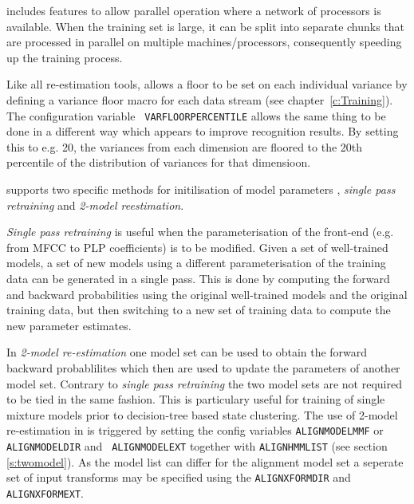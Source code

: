  includes features to allow parallel operation where a network
of processors is available. When the training set is large, it can be split into separate chunks that are processed in parallel on multiple machines/processors, consequently speeding up the training process. 

Like all re-estimation tools,  allows a floor to be set on
each individual variance by defining a variance floor macro for each data
stream (see chapter~\ref{c:Training}).  The configuration variable {\tt
VARFLOORPERCENTILE} allows the same thing to be done in a different way
which appears to improve recognition results.  By setting this to e.g. 20,
the variances from each dimension are floored to the 20th percentile of the
distribution of variances for that dimensioon.



 supports two specific methods for initilisation of
model parameters , \textit{single pass retraining} and \textit{2-model
  reestimation}.

\textit{Single pass retraining} is useful when the parameterisation of
the front-end (e.g. from MFCC to PLP coefficients) is to be modified.
Given a set of well-trained models, a set of new models using a
different parameterisation of the training data can be generated in a
single pass.  This is done by computing the forward and backward
probabilities using the original well-trained models and the original
training data, but then switching to a new set of training data to
compute the new parameter estimates.

In \textit{2-model re-estimation} one model set can be used to obtain
the forward backward probablilites which then are used to update the
parameters of another model set. Contrary to \textit{single pass
  retraining} the two model sets are not required to be tied in the
same fashion.  This is particulary useful for training of single
mixture models prior to decision-tree based state clustering. The use
of 2-model re-estimation in  is triggered by setting the
config variables {\tt ALIGNMODELMMF} or {\tt ALIGNMODELDIR} and {\tt
  ALIGNMODELEXT} together with {\tt ALIGNHMMLIST} (see section \ref{s:twomodel}).
As the model list can differ for the alignment model set a seperate set of
input transforms may be specified using the {\tt ALIGNXFORMDIR} and
{\tt ALIGNXFORMEXT}. 

